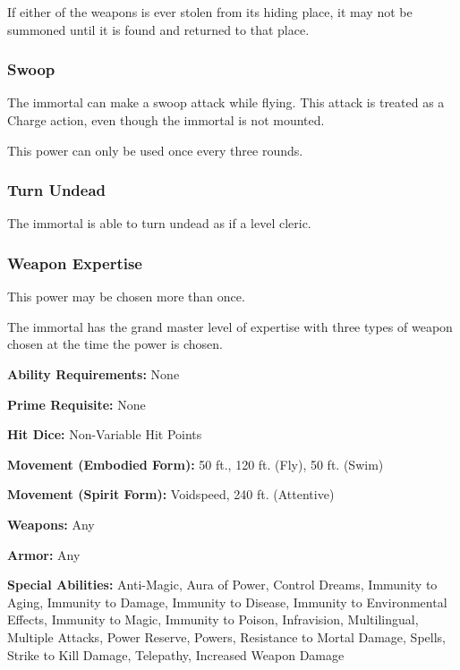 \begin{multicols*}{2}
If either of the weapons is ever stolen from its hiding place, it may not be summoned until it is found and returned to that place.
\subsubsection{Swoop}

The immortal can make a swoop attack while flying. This attack is treated as a Charge action, even though the immortal is not mounted.

This power can only be used once every three rounds.

\subsubsection{Turn Undead}
The immortal is able to turn undead as if a  level cleric.

\subsubsection{Weapon Expertise}
This power may be chosen more than once.

The immortal has the grand master level of expertise with three types of weapon chosen at the time the power is chosen.

\textbf{Ability Requirements:} None

\textbf{Prime Requisite:} None

\textbf{Hit Dice:} Non-Variable Hit Points

\textbf{Movement (Embodied Form):} 50 ft., 120 ft. (Fly), 50 ft. (Swim)

\textbf{Movement (Spirit Form):} Voidspeed, 240 ft. (Attentive)

\textbf{Weapons:} Any

\textbf{Armor:} Any

\textbf{Special Abilities:} Anti-Magic, Aura of Power, Control Dreams, Immunity to Aging, Immunity to Damage, Immunity to Disease, Immunity to Environmental Effects, Immunity to Magic, Immunity to Poison, Infravision, Multilingual, Multiple Attacks, Power Reserve, Powers, Resistance to Mortal Damage, Spells, Strike to Kill Damage, Telepathy, Increased Weapon Damage

\end{multicols*}
